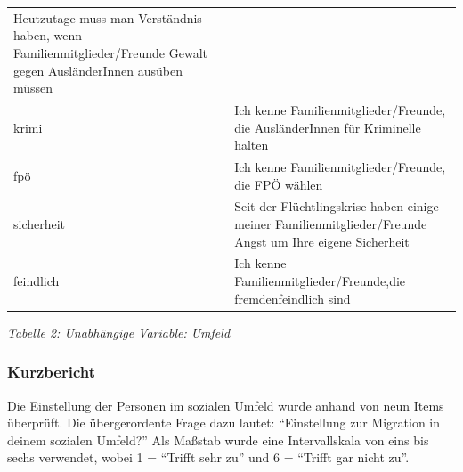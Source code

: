 \documentclass[]{article}
\begin{document}
\begin{longtable}[]{@{}ll@{}}
\begin{minipage}[t]{0.85\columnwidth}
Heutzutage muss man Verständnis haben, wenn Familienmitglieder/Freunde
Gewalt gegen AusländerInnen ausüben müssen\strut
\end{minipage}\tabularnewline
\begin{minipage}[t]{0.09\columnwidth}\raggedright\strut
krimi\strut
\end{minipage} & \begin{minipage}[t]{0.85\columnwidth}\raggedright\strut
Ich kenne Familienmitglieder/Freunde, die AusländerInnen für Kriminelle
halten\strut
\end{minipage}\tabularnewline
\begin{minipage}[t]{0.09\columnwidth}\raggedright\strut
fpö \textbar{}\strut
\end{minipage} & \begin{minipage}[t]{0.85\columnwidth}\raggedright\strut
Ich kenne Familienmitglieder/Freunde, die FPÖ wählen\strut
\end{minipage}\tabularnewline
\begin{minipage}[t]{0.09\columnwidth}\raggedright\strut
sicherheit\strut
\end{minipage} & \begin{minipage}[t]{0.85\columnwidth}\raggedright\strut
Seit der Flüchtlingskrise haben einige meiner Familienmitglieder/Freunde
Angst um Ihre eigene Sicherheit\strut
\end{minipage}\tabularnewline
\begin{minipage}[t]{0.09\columnwidth}\raggedright\strut
feindlich\strut
\end{minipage} & \begin{minipage}[t]{0.85\columnwidth}\raggedright\strut
Ich kenne Familienmitglieder/Freunde,die fremdenfeindlich sind\strut
\end{minipage}\tabularnewline
\bottomrule
\end{longtable}

\begin{center}
\textit{Tabelle 2: Unabhängige Variable: Umfeld}
\bigskip
\end{center}

\subsubsection{Kurzbericht}\label{kurzbericht}

Die Einstellung der Personen im sozialen Umfeld wurde anhand von neun
Items überprüft. Die übergerordente Frage dazu lautet: ``Einstellung zur
Migration in deinem sozialen Umfeld?'' Als Maßstab wurde eine
Intervallskala von eins bis sechs verwendet, wobei 1 = ``Trifft sehr
zu'' und 6 = ``Trifft gar nicht zu''.
\end{document}
